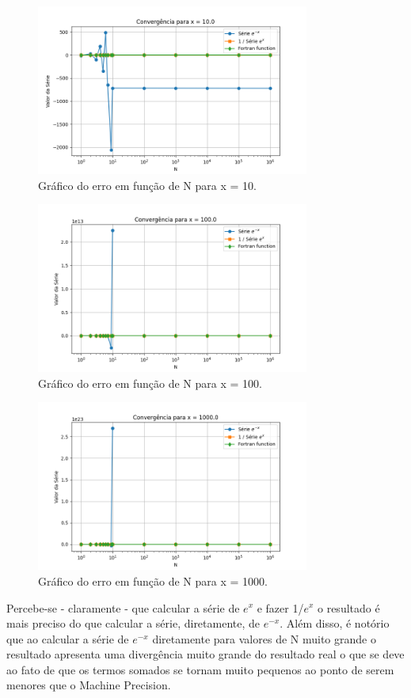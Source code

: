 \documentclass[12pt, a4paper]{article} %
\begin{document}
    \begin{figure}[H]
        \centering
        \includegraphics[width=0.8\textwidth]{../images/grafico_x_10.0.png}
        \caption{Gr\'afico do erro em fun\c{c}\~ao de N para x = 10.}
    \end{figure}

    \begin{figure}[H]
        \centering
        \includegraphics[width=0.8\textwidth]{../images/grafico_x_100.0.png}
        \caption{Gr\'afico do erro em fun\c{c}\~ao de N para x = 100.}
    \end{figure}

    \begin{figure}[H]
        \centering
        \includegraphics[width=0.8\textwidth]{../images/grafico_x_1000.0.png}
        \caption{Gr\'afico do erro em fun\c{c}\~ao de N para x = 1000.}
    \end{figure}

    Percebe-se - claramente - que calcular a s\'erie de $e^x$ e fazer 1/$e^x$ o resultado \'e mais preciso do que calcular a s\'erie, diretamente, de $e^{-x}$. Al\'em disso, \'e not\'orio que ao calcular a s\'erie de $e^{-x}$  diretamente para valores de N muito grande o resultado apresenta uma diverg\^encia muito grande do resultado real o que se deve ao fato de que os termos somados se tornam muito pequenos ao ponto de serem menores que o Machine Precision.
\end{document}
